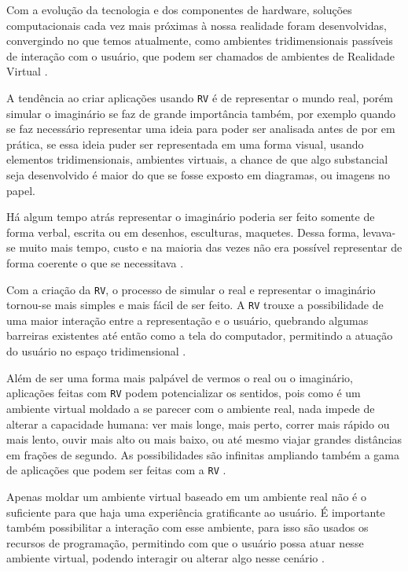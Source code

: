 Com a evolução da tecnologia e dos componentes de hardware, soluções computacionais cada vez mais próximas à
nossa realidade foram desenvolvidas, convergindo no que temos atualmente, como ambientes tridimensionais
passíveis de interação com o usuário, que podem ser chamados de ambientes de Realidade Virtual
\cite{kirner2006}.

A tendência ao criar aplicações usando \verb'RV' é de representar o mundo real, porém simular o imaginário se
faz de grande importância também, por exemplo quando se faz necessário representar uma ideia para poder ser
analisada antes de por em prática, se essa ideia puder ser representada em uma forma visual, usando elementos
tridimensionais, ambientes virtuais, a chance de que algo substancial seja desenvolvido é maior do que se
fosse exposto em diagramas, ou imagens no papel.

Há algum tempo atrás representar o imaginário poderia ser feito somente de forma verbal, escrita ou  em
desenhos, esculturas, maquetes. Dessa forma, levava-se muito mais tempo, custo e na maioria das vezes não era
possível representar de forma coerente o que se necessitava \cite{kirner2006}.

Com a criação da \verb'RV', o processo de simular o real e representar o imaginário tornou-se mais simples e
mais fácil de ser feito. A \verb'RV' trouxe a possibilidade de uma maior interação entre a representação e o
usuário, quebrando algumas barreiras existentes até então como a tela do computador, permitindo a atuação do
usuário no espaço tridimensional \cite{kirner2006}.

Além de ser uma forma mais palpável de vermos o real ou o imaginário, aplicações feitas com \verb'RV' podem
potencializar os sentidos, pois como é um ambiente virtual moldado a se parecer com o ambiente real, nada
impede de alterar a capacidade humana: ver mais longe, mais perto, correr mais rápido ou mais lento, ouvir
mais alto ou mais baixo, ou até mesmo viajar grandes distâncias em frações de segundo. As possibilidades são
infinitas ampliando também a gama de aplicações que podem ser feitas com a \verb'RV' \cite{kirner2006}.

Apenas moldar um ambiente virtual baseado em um ambiente real não é o suficiente para que haja uma experiência
gratificante ao usuário. É importante também possibilitar a interação com esse ambiente, para isso são usados
os recursos de programação, permitindo com que o usuário possa atuar nesse ambiente virtual, podendo interagir
ou alterar algo nesse cenário \cite{kirner2006}.

